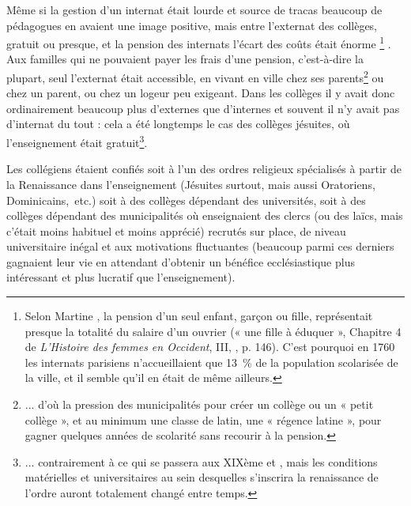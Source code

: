 Même si la gestion d'un internat était lourde et source de tracas beaucoup de pédagogues en avaient une image positive, mais entre l'externat des collèges, gratuit ou presque, et la pension des internats l'écart des coûts était énorme%
\footnote{Selon Martine , la pension d'un seul enfant, garçon ou fille, représentait presque la totalité du salaire d'un ouvrier (« une fille à éduquer », Chapitre 4 de \emph{L'Histoire des femmes en Occident}, III, , p. 146). C'est pourquoi en 1760 les internats parisiens n'accueillaient que 13~\% de la population scolarisée de la ville, et il semble qu'il en était de même ailleurs.}%
. Aux familles qui ne pouvaient payer les frais d'une pension, c'est-à-dire la plupart, seul l'externat était accessible, en vivant en ville chez ses parents\footnote{... d'où la pression des municipalités pour créer un collège ou un « petit collège », et au minimum une classe de latin, une « régence latine », pour gagner quelques années de scolarité sans recourir à la pension.} ou chez un parent, ou chez un logeur peu exigeant. Dans les collèges il y avait donc ordinairement beaucoup plus d'externes que d'internes et souvent il n'y avait pas d'internat du tout : cela a été longtemps le cas des collèges jésuites, où l'enseignement était gratuit\footnote{... contrairement à ce qui se passera aux XIXème et , mais les conditions matérielles et universitaires au sein desquelles s'inscrira la renaissance de l'ordre auront totalement changé entre temps.}. 

 
 

Les collégiens étaient confiés soit à l'un des ordres religieux spécialisés à partir de la Renaissance dans l'enseignement (Jésuites surtout, mais aussi Oratoriens, Dominicains,~etc.) soit à des collèges dépendant des universités, soit à des collèges dépendant des municipalités où enseignaient des clercs (ou des laïcs, mais c'était moins habituel et moins apprécié) recrutés sur place, de niveau universitaire inégal et aux motivations fluctuantes (beaucoup parmi ces derniers gagnaient leur vie en attendant d'obtenir un bénéfice ecclésiastique plus intéressant et plus lucratif que l'enseignement). 

